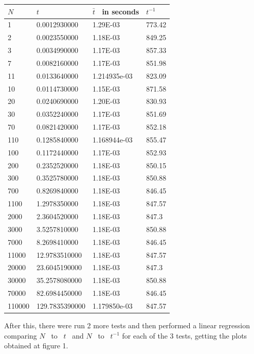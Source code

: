 \documentclass{article}
\begin{document}
\begin{center}
\tablefirsthead{}
\tablehead{}
\tabletail{}
\tablelasttail{}
\begin{supertabular}{m{3.6959999cm}m{3.6959999cm}m{3.6959999cm}m{3.698cm}}
\hline
 $N$  &
 $t$  &
 $\bar t$ \ in seconds &
 $t^{-1}$ \\ &
0.0012930000 &
1.29E-03 &
773.42\\
2 &
0.0023550000 &
1.18E-03 &
849.25\\
3 &
0.0034990000 &
1.17E-03 &
857.33\\
7 &
0.0082160000 &
1.17E-03 &
851.98\\
11 &
0.0133640000 &
1.214935e-03 &
823.09\\
10 &
0.0114730000 &
1.15E-03 &
871.58\\
20 &
0.0240690000 &
1.20E-03 &
830.93\\
30 &
0.0352240000 &
1.17E-03 &
851.69\\
70 &
0.0821420000 &
1.17E-03 &
852.18\\
110 &
0.1285840000 &
1.168944e-03 &
855.47\\
100 &
0.1172440000 &
1.17E-03 &
852.93\\
200 &
0.2352520000 &
1.18E-03 &
850.15\\
300 &
0.3525780000 &
1.18E-03 &
850.88\\
700 &
0.8269840000 &
1.18E-03 &
846.45\\
1100 &
1.2978350000 &
1.18E-03 &
847.57\\
2000 &
2.3604520000 &
1.18E-03 &
847.3\\
3000 &
3.5257810000 &
1.18E-03 &
850.88\\
7000 &
8.2698410000 &
1.18E-03 &
846.45\\
11000 &
12.9783510000 &
1.18E-03 &
847.57\\
20000 &
23.6045190000 &
1.18E-03 &
847.3\\
30000 &
35.2578080000 &
1.18E-03 &
850.88\\
70000 &
82.6984450000 &
1.18E-03 &
846.45\\
110000 &
129.7835390000 &
1.179850e-03 &
847.57\\\hline
\end{supertabular}
\end{center}
After this, there were run 2 more tests and then performed a linear regression comparing  $N$  to  $t$  \ and  $N$  to 
$t^{-1}$  for each of the 3 tests, getting the plots obtained at figure 1.
\end{document}
